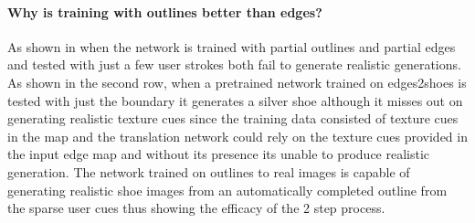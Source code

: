 \paragraph{Why is training with outlines better than edges?}


As shown in  when the network is trained with partial outlines and partial edges and tested with just a few user strokes both fail to generate realistic generations. As shown in the second row, when a pretrained network trained on edges2shoes is tested with just the boundary it generates a silver shoe although it misses out on generating realistic texture cues since the training data consisted of texture cues in the map and the translation network could rely on the texture cues provided in the input edge map and without its presence its unable to produce realistic generation. The network trained on outlines to real images is capable of generating realistic shoe images from an automatically completed outline from the sparse user cues thus showing the efficacy of the 2 step process. 

